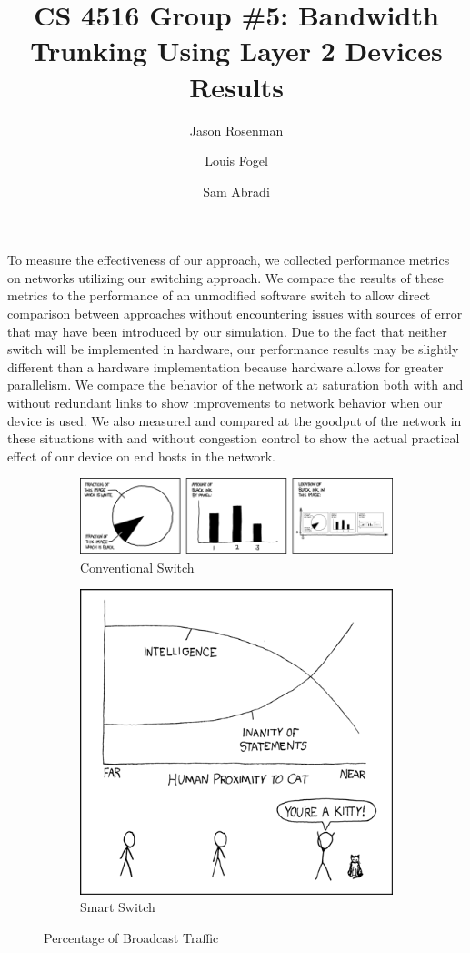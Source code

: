 \documentclass{article}
\title{CS 4516 Group \#5: Bandwidth Trunking Using Layer 2 Devices\\Results}
\author{Jason Rosenman \and Louis Fogel \and Sam Abradi}
\date{}
\begin{document}
\maketitle
To measure the effectiveness of our approach, we collected performance metrics on networks utilizing our switching approach.
We compare the results of these metrics to the performance of an unmodified software switch to allow direct comparison between approaches without encountering issues with sources of error that may have been introduced by our simulation.
Due to the fact that neither switch will be implemented in hardware, our performance results may be slightly different than a hardware implementation because hardware allows for greater parallelism.
We compare the behavior of the network at saturation both with and without redundant links to show improvements to network behavior when our device is used.
We also measured and compared at the goodput of the network in these situations with and without congestion control to show the actual practical effect of our device on end hosts in the network.
\begin{figure}[ht]
	\centering
	\begin{subfigure}[b]{0.4\textwidth}
		\centering
		\includegraphics[scale=0.4]{self_description.png}
		\caption{Conventional Switch}
		\label{fig:stdbcast}
	\end{subfigure}
	\hfill
	\begin{subfigure}[b]{0.4\textwidth}
		\centering
		\includegraphics[scale=0.3]{cat_proximity.png}
		\caption{Smart Switch}
		\label{fig:newbcast}
	\end{subfigure}
	\caption{Percentage of Broadcast Traffic}
	\label{fig:bcast}
\end{figure}
\end{document}
